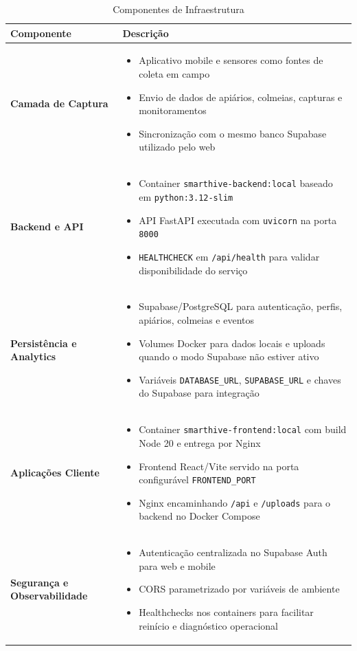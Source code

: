 \documentclass[11pt,a4paper]{article}
\begin{document}
\begin{table}[H]
\centering
\caption{Componentes de Infraestrutura}
\label{tab:infrastructure}
\begin{tabular}{|l|p{10cm}|}
\hline
\textbf{Componente} & \textbf{Descrição} \\
\hline
\textbf{Camada de Captura} &
\begin{itemize}[leftmargin=*, nosep]
    \item Aplicativo mobile e sensores como fontes de coleta em campo
    \item Envio de dados de apiários, colmeias, capturas e monitoramentos
    \item Sincronização com o mesmo banco Supabase utilizado pelo web
\end{itemize} \\
\hline
\textbf{Backend e API} &
\begin{itemize}[leftmargin=*, nosep]
    \item Container \texttt{smarthive-backend:local} baseado em \texttt{python:3.12-slim}
    \item API FastAPI executada com \texttt{uvicorn} na porta \texttt{8000}
    \item \texttt{HEALTHCHECK} em \texttt{/api/health} para validar disponibilidade do serviço
\end{itemize} \\
\hline
\textbf{Persistência e Analytics} &
\begin{itemize}[leftmargin=*, nosep]
    \item Supabase/PostgreSQL para autenticação, perfis, apiários, colmeias e eventos
    \item Volumes Docker para dados locais e uploads quando o modo Supabase não estiver ativo
    \item Variáveis \texttt{DATABASE\_URL}, \texttt{SUPABASE\_URL} e chaves do Supabase para integração
\end{itemize} \\
\hline
\textbf{Aplicações Cliente} &
\begin{itemize}[leftmargin=*, nosep]
    \item Container \texttt{smarthive-frontend:local} com build Node 20 e entrega por Nginx
    \item Frontend React/Vite servido na porta configurável \texttt{FRONTEND\_PORT}
    \item Nginx encaminhando \texttt{/api} e \texttt{/uploads} para o backend no Docker Compose
\end{itemize} \\
\hline
\textbf{Segurança e Observabilidade} &
\begin{itemize}[leftmargin=*, nosep]
    \item Autenticação centralizada no Supabase Auth para web e mobile
    \item CORS parametrizado por variáveis de ambiente
    \item Healthchecks nos containers para facilitar reinício e diagnóstico operacional
\end{itemize} \\
\hline
\end{tabular}
\end{table}
\end{document}
